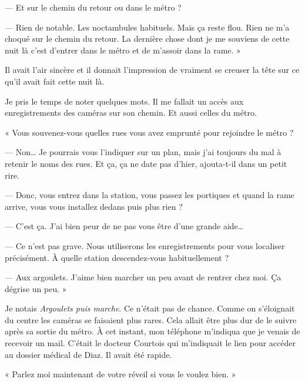 — Et sur le chemin du retour ou dans le métro ?

— Rien de notable. Les noctambules habituels. Mais ça reste flou. Rien ne m'a choqué sur le chemin du retour. La
dernière chose dont je me souviens de cette nuit là c'est d'entrer dans le métro et de m'assoir dans la rame. »

Il avait l'air sincère et il donnait l'impression de vraiment se creuser la tête sur ce qu'il avait fait cette nuit là.

Je pris le temps de noter quelques mots. Il me fallait un accès aux enregistrements des caméras sur son chemin. Et
aussi celles du métro.

« Vous souvenez-vous quelles rues vous avez emprunté pour rejoindre le métro ?

— Non… Je pourrais vous l'indiquer sur un plan, mais j'ai toujours du mal à retenir le noms des rues. Et ça, ça ne date
pas d'hier, ajouta-t-il dans un petit rire.

— Donc, vous entrez dans la station, vous passez les portiques et quand la rame arrive, vous vous installez dedans puis
plus rien ?

— C'est ça. J'ai bien peur de ne pas vous être d'une grande aide…

— Ce n'est pas grave. Nous utiliserons les enregistrements pour vous localiser précisément. À quelle station
descendez-vous habituellement ?

— Aux argoulets. J'aime bien marcher un peu avant de rentrer chez moi. Ça dégrise un peu. »

Je notais \emph{Argoulets puis marche}. Ce n'était pas de chance. Comme on s'éloignait du centre les caméras se
faisaient plus rares. Cela allait être plus dur de le suivre après sa sortie du métro. À cet instant, mon téléphone
m'indiqua que je venais de recevoir un mail. C'était le docteur Courtois qui m'indiquait le lien pour accéder au dossier
médical de Diaz. Il avait été rapide.

« Parlez moi maintenant de votre réveil si vous le voulez bien. »